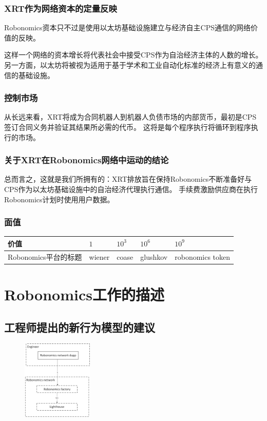 \documentclass[UTF8]{article}
\begin{document}
\subsubsection{XRT作为网络资本的定量反映}

Robonomics资本只不过是使用以太坊基础设施建立与经济自主CPS通信的网络价值的反映。
 
这样一个网络的资本增长将代表社会中接受CPS作为自治经济主体的人数的增长。 另一方面，以太坊将被视为适用于基于学术和工业自动化标准的经济上有意义的通信的基础设施。

\subsubsection{控制市场}

从长远来看，XRT将成为合同机器人到机器人负债市场的内部货币，最初是CPS签订合同义务并验证其结果所必需的代币。 这将是每个程序执行将循环到程序执行的市场。

\subsubsection{关于XRT在Robonomics网络中运动的结论}

总而言之，这就是我们所拥有的：XRT排放旨在保持Robonomics不断准备好与CPS作为以太坊基础设施中的自治经济代理执行通信。 手续费激励供应商在执行Robonomics计划时使用用户数据。

\subsubsection{面值}
\begin{tabular}{ l |l |l |l |l}
 价值 &  $1$ & $10^3$ & $10^6$  & $10^9$ \\ 
 \hline
 Robonomics平台的标题 &  wiener & coase  & glushkov & robonomics token\\ 
\end{tabular}

\section{Robonomics工作的描述}
\subsection{工程师提出的新行为模型的建议}

\begin{figure} %
    \centering
    \includegraphics[width=0.30\textwidth]{step-by-step-1.png}
\end{figure}
\end{document}
